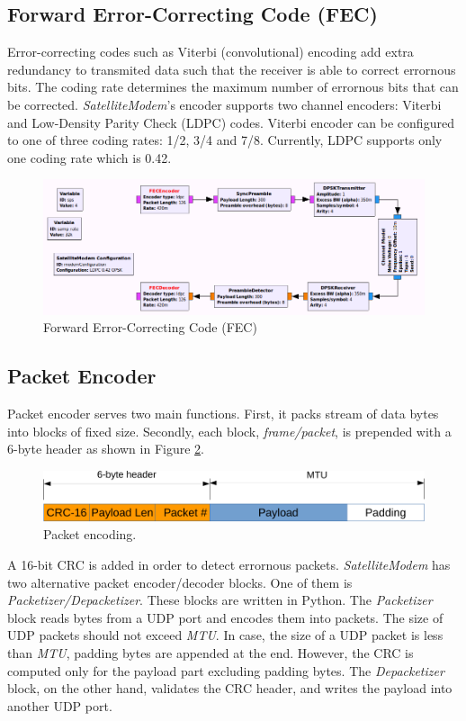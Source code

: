 \documentclass[peerreview,onecolumn]{IEEEtran}
\begin{document}
\subsection{Forward Error-Correcting Code (FEC)}
Error-correcting codes such as Viterbi (convolutional) encoding add extra redundancy to transmited data such that the receiver is able to correct errornous bits. The coding rate determines the maximum number of errornous bits that can be corrected. \emph{SatelliteModem}'s encoder supports two channel encoders: Viterbi and Low-Density Parity Check (LDPC) codes. Viterbi encoder can be configured to one of three coding rates: 1/2, 3/4 and 7/8. Currently, LDPC supports only one coding rate which is 0.42.
\begin{figure}[h]
\centering
\includegraphics[width=0.5\columnwidth]{Images/fec} 
\caption{Forward Error-Correcting Code (FEC)}
\label{fig_viterbi}
\end{figure}

\subsection{Packet Encoder}
Packet encoder serves two main functions. First, it packs stream of data bytes into blocks of fixed size. Secondly, each block, \emph{frame/packet}, is prepended with a 6-byte header as shown in Figure \ref{fig_packet}.

\begin{figure}[h]
\centering
\includegraphics[width=0.5\columnwidth]{Images/packet} 
\caption{Packet encoding.}
\label{fig_packet}
\end{figure}

A 16-bit CRC is added in order to detect errornous packets. \emph{SatelliteModem} has two alternative packet encoder/decoder blocks. One of them is \emph{Packetizer/Depacketizer}. These blocks are written in Python. The \emph{Packetizer} block reads bytes from a UDP port and encodes them into packets. The size of UDP packets should not exceed \emph{MTU}. In case, the size of a UDP packet is less than \emph{MTU}, padding bytes are appended at the end. However, the CRC is computed only for the payload part excluding padding bytes. The \emph{Depacketizer} block, on the other hand, validates the CRC header, and writes the payload into another UDP port. 
\end{document}
